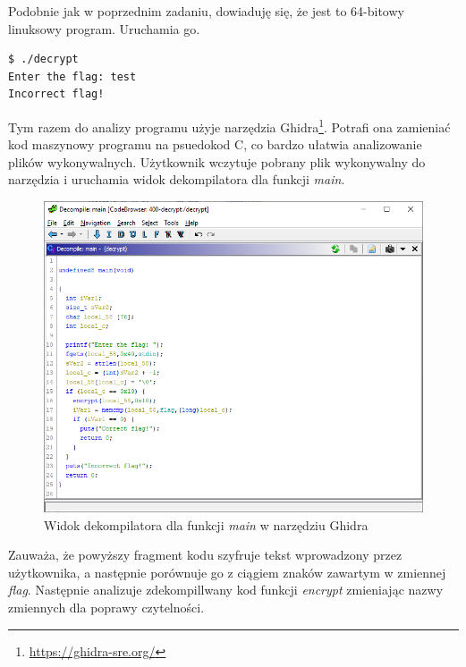 \documentclass[language=polish,type=eng]{aghmodern}
\begin{document}
\begin{appendices}
Podobnie jak w poprzednim zadaniu, dowiaduję się, że jest to 64-bitowy linuksowy program.
Uruchamia go.

\begin{verbatim}
$ ./decrypt
Enter the flag: test
Incorrect flag!
\end{verbatim}

Tym razem do analizy programu użyje narzędzia Ghidra\footnote{\url{https://ghidra-sre.org/}}.
Potrafi ona zamieniać kod maszynowy programu na psuedokod C, co bardzo ułatwia
analizowanie plików wykonywalnych.
Użytkownik wczytuje pobrany plik wykonywalny do narzędzia i uruchamia widok dekompilatora
dla funkcji \emph{main}.

\begin{figure}[H]
\centering
\includegraphics[width=\textwidth]{400_main}
\caption{Widok dekompilatora dla funkcji \emph{main} w narzędziu Ghidra}
\end{figure}

Zauważa, że powyższy fragment kodu szyfruje tekst wprowadzony przez użytkownika,
a następnie porównuje go z ciągiem znaków zawartym w zmiennej \emph{flag}.
Następnie analizuje zdekompillwany kod funkcji \emph{encrypt} zmieniając nazwy zmiennych
dla poprawy czytelności.


\end{appendices}
\end{document}
